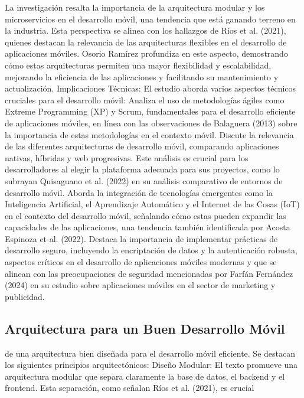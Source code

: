 \documentclass[12pt]{article}
\begin{document}
La investigación resalta la importancia de la arquitectura modular y los microservicios en el desarrollo móvil, una tendencia que está ganando terreno en la industria. Esta perspectiva se alinea con los hallazgos de Ríos et al. (2021), quienes destacan la relevancia de las arquitecturas flexibles en el desarrollo de aplicaciones móviles. Osorio Ramírez profundiza en este aspecto, demostrando cómo estas arquitecturas permiten una mayor flexibilidad y escalabilidad, mejorando la eficiencia de las aplicaciones y facilitando su mantenimiento y actualización.
Implicaciones Técnicas: El estudio aborda varios aspectos técnicos cruciales para el desarrollo móvil:
Analiza el uso de metodologías ágiles como Extreme Programming (XP) y Scrum, fundamentales para el desarrollo eficiente de aplicaciones móviles, en línea con las observaciones de Balaguera (2013) sobre la importancia de estas metodologías en el contexto móvil.
Discute la relevancia de las diferentes arquitecturas de desarrollo móvil, comparando aplicaciones nativas, híbridas y web progresivas. Este análisis es crucial para los desarrolladores al elegir la plataforma adecuada para sus proyectos, como lo subrayan Quisaguano et al. (2022) en su análisis comparativo de entornos de desarrollo móvil.
Aborda la integración de tecnologías emergentes como la Inteligencia Artificial, el Aprendizaje Automático y el Internet de las Cosas (IoT) en el contexto del desarrollo móvil, señalando cómo estas pueden expandir las capacidades de las aplicaciones, una tendencia también identificada por Acosta Espinoza et al. (2022).
Destaca la importancia de implementar prácticas de desarrollo seguro, incluyendo la encriptación de datos y la autenticación robusta, aspectos críticos en el desarrollo de aplicaciones móviles modernas y que se alinean con las preocupaciones de seguridad mencionadas por Farfán Fernández (2024) en su estudio sobre aplicaciones móviles en el sector de marketing y publicidad.

\subsection*{Arquitectura para un Buen Desarrollo Móvil}
de una arquitectura bien diseñada para el desarrollo móvil eficiente. Se destacan los siguientes principios arquitectónicos:
Diseño Modular: El texto promueve una arquitectura modular que separa claramente la base de datos, el backend y el frontend. Esta separación, como señalan Ríos et al. (2021), es crucial
 
\end{document}
